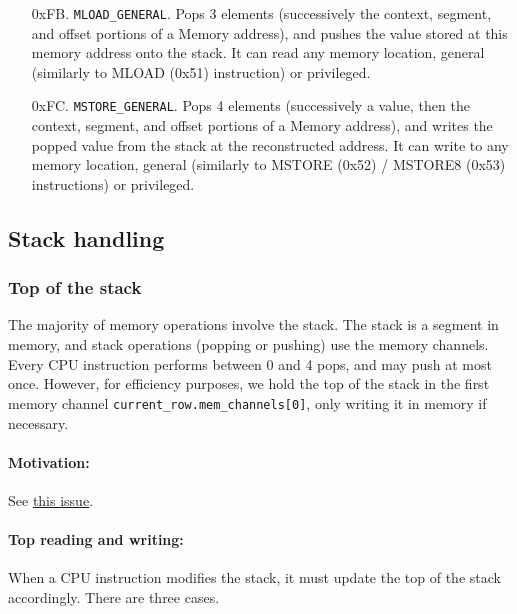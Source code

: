 \begin{enumerate}[align=left]
  \item[0xFB.] \texttt{MLOAD\_GENERAL}. Pops 3 elements (successively the context, segment, and offset portions of a Memory address), and pushes the value stored at this memory
  address onto the stack. It can read any memory location, general (similarly to MLOAD (0x51) instruction) or privileged.

  \item[0xFC.] \texttt{MSTORE\_GENERAL}. Pops 4 elements (successively a value, then the context, segment, and offset portions of a Memory address), and writes the popped value from
  the stack at the reconstructed address. It can write to any memory location, general (similarly to MSTORE (0x52) / MSTORE8 (0x53) instructions) or privileged.

\end{enumerate}


\subsection{Stack handling}
\label{stackhandling}

\subsubsection{Top of the stack}

The majority of memory operations involve the stack. The stack is a segment in memory, and stack operations (popping or pushing) use the memory channels.
Every CPU instruction performs between 0 and 4 pops, and may push at most once. However, for efficiency purposes, we hold the top of the stack in
the first memory channel \texttt{current\_row.mem\_channels[0]}, only writing it in memory if necessary.

\paragraph*{Motivation:}

See \href{https://github.com/0xPolygonZero/plonky2/issues/1149}{this issue}.

\paragraph*{Top reading and writing:}

When a CPU instruction modifies the stack, it must update the top of the stack accordingly. There are three cases.

